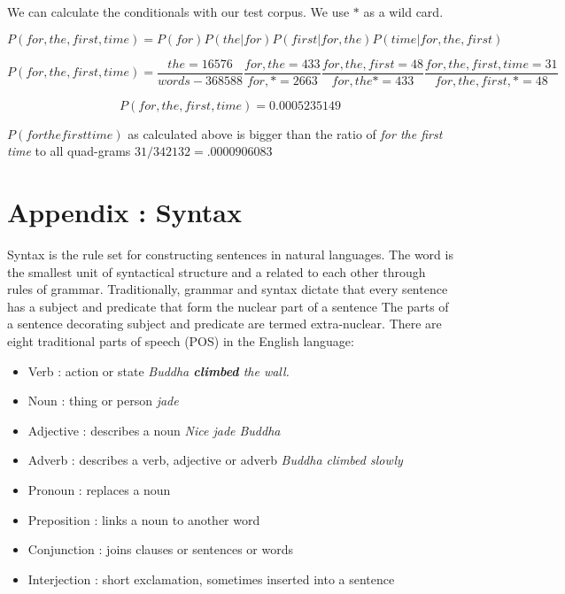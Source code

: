 We can calculate the conditionals with our test corpus.  We use $*$ as a wild card.

\[P(for, the, first, time) = P(for)  P(the | for)  P(first | for, the)  P(time | for, the, first)\]

\[P(for, the, first, time) =  \frac{the=16576}{words-368588}  \frac{for, the =433}{for, * = 2663} \frac{for, the, first =48}{for, the * = 433}  \frac{for, the, first, time  =31}{for, the, first, * = 48} \]

\[P(for, the, first, time) =  0.0005235149\]

$P(for the first time)$ as calculated above is bigger than the ratio of \emph{for the first time} to all quad-grams $31/342132 = .0000906083$

\section{Appendix : Syntax}
Syntax is the rule set for constructing sentences in natural languages.  The word is the smallest unit of syntactical structure and a related to each other through rules of grammar.  Traditionally, grammar and syntax dictate that every sentence has a subject and predicate that form the nuclear part of a sentence  The parts of a sentence decorating subject and predicate are termed extra-nuclear.
There are eight traditional parts of speech (POS) in the English language:
\begin{itemize}
  \item Verb : action or state \emph{Buddha \textbf{climbed} the wall.}
  \item Noun : thing or person \emph{jade}
  \item Adjective : describes a noun \emph{Nice jade Buddha}
  \item Adverb : describes a verb, adjective or adverb \emph{Buddha climbed slowly}
  \item Pronoun : replaces a noun
  \item Preposition : links a noun to another word
  \item Conjunction : joins clauses or sentences or words
  \item Interjection : short exclamation, sometimes inserted into a sentence
\end{itemize}

